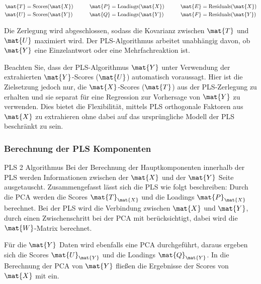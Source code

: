 \begin{alignat*}{3}
    \mat{T} &= \mathrm{Scores}(\mat{X}) &\qquad \mat{P} &= \mathrm{Loadings}(\mat{X}) &\qquad \mat{E} &= \mathrm{Residuals}(\mat{X}) \\
    \mat{U} &= \mathrm{Scores}(\mat{Y}) &\qquad \mat{Q} &= \mathrm{Loadings}(\mat{Y}) &\qquad \mat{F} &= \mathrm{Residuals}(\mat{Y})
\end{alignat*}

Die Zerlegung wird abgeschlossen, sodass die Kovarianz zwischen $\mat{T}$ und $\mat{U}$ maximiert wird.
 Der \gls{PLS}-Algorithmus arbeitet unabhängig davon, ob $\mat{Y}$ eine Einzelantwort oder eine Mehrfachreaktion ist.

Beachten Sie, dass der \gls{PLS}-Algorithmus $\mat{Y}$ unter Verwendung der extrahierten $\mat{Y}$-Scores ($\mat{U}$) automatisch voraussagt.
Hier ist die Zielsetzung jedoch nur, die $\mat{X}$-Scores ($\mat{T}$) aus der \gls{PLS}-Zerlegung zu erhalten und sie separat für eine Regression zur Vorhersage von $\mat{Y}$ zu verwenden.
Dies bietet die Flexibilität, mittels \gls{PLS} orthogonale Faktoren aus $\mat{X}$ zu extrahieren ohne dabei auf das ursprüngliche Modell der \gls{PLS} beschränkt zu sein.

\subsubsection{Berechnung der PLS Komponenten}
PLS 2 Algorithmus \cite{kessler_2008}
Bei der Berechnung der Hauptkomponenten innerhalb der \gls{PLS} werden Informationen zwischen der $\mat{X}$ und der $\mat{Y}$ Seite ausgetauscht.
Zusammengefasst lässt sich die \gls{PLS} wie folgt beschreiben: Durch die \gls{PCA} werden die Scores $\mat{T}_\mat{X}$ und die Loadings $\mat{P}_\mat{X}$ berechnet.
Bei der \gls{PLS} wird die Verbindung zwischen $\mat{X}$ und $\mat{Y}$, durch einen Zwischenschritt bei der \gls{PCA} mit berücksichtigt, dabei wird die $\mat{W}$-Matrix berechnet.

Für die $\mat{Y}$ Daten wird ebenfalls eine \gls{PCA} durchgeführt, daraus ergeben sich die Scores $\mat{U}_\mat{Y}$ und die Loadings $\mat{Q}_\mat{Y}$.
In die Berechnung der \gls{PCA} von $\mat{Y}$ fließen die Ergebnisse der Scores von $\mat{X}$ mit ein.

